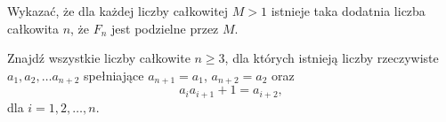 









\noindent
Wykazać, że dla każdej liczby całkowitej $M > 1$ istnieje taka dodatnia liczba całkowita $n$, że $F_n$ jest podzielne przez $M$.




\noindent
Znajdź wszystkie liczby całkowite $n \geq 3$, dla których istnieją liczby rzeczywiste $a_1, a_2, \dots a_{n + 2}$ spełniające $a_{n + 1} = a_1$, $a_{n + 2} = a_2$ oraz
\[
	a_ia_{i + 1} + 1 = a_{i + 2},
\]
dla $i = 1, 2, \dots, n$.



